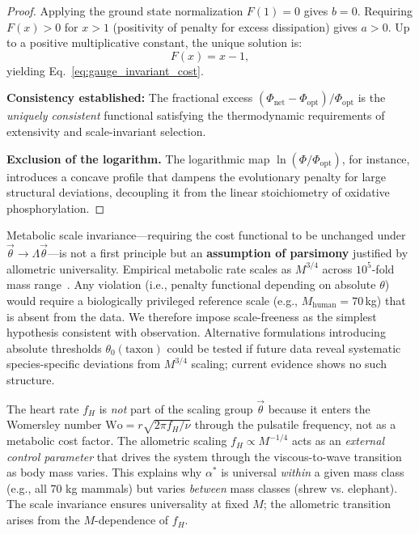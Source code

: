 \begin{proof}
Applying the ground state normalization $F(1) = 0$ gives $b = 0$. Requiring
$F(x) > 0$ for $x > 1$ (positivity of penalty for excess dissipation) gives $a >
0$. Up to a positive multiplicative constant, the unique solution is:
\begin{equation}
    F(x) = x - 1,
\end{equation}
yielding Eq.~\eqref{eq:gauge_invariant_cost}.

\textbf{Consistency established:} The fractional excess $(\Phi_{\mathrm{net}} -
\Phi_{\mathrm{opt}})/\Phi_{\mathrm{opt}}$ is the \emph{uniquely consistent}
functional satisfying the thermodynamic requirements of extensivity and
scale-invariant selection.

\textbf{Exclusion of the logarithm.} The logarithmic map
$\ln(\Phi/\Phi_{\mathrm{opt}})$, for instance, introduces a concave profile that
dampens the evolutionary penalty for large structural deviations, decoupling it
from the linear stoichiometry of oxidative phosphorylation.
\end{proof}

\begin{remark}
\label{rem:gauge_parsimony}
Metabolic scale invariance---requiring the cost functional to be unchanged
under $\vec{\theta} \to \Lambda \vec{\theta}$---is not a first principle but an
\textbf{assumption of parsimony} justified by allometric universality. Empirical
metabolic rate scales as $M^{3/4}$ across $10^5$-fold mass
range~\cite{savage2004}. Any violation (i.e., penalty functional depending on
absolute $\theta$) would require a biologically privileged reference scale
(e.g., $M_{\mathrm{human}} = 70\,$kg) that is absent from the data. We therefore
impose scale-freeness as the simplest hypothesis consistent with observation.
Alternative formulations introducing absolute thresholds
$\theta_0(\mathrm{taxon})$ could be tested if future data reveal systematic
species-specific deviations from $M^{3/4}$ scaling; current evidence shows
no such structure.
\end{remark}

\begin{remark}
The heart rate $f_H$ is \emph{not} part of the scaling group $\vec{\theta}$
because it enters the Womersley number $\mathrm{Wo} = r\sqrt{2\pi f_H/\nu}$
through the pulsatile frequency, not as a metabolic cost factor. The allometric
scaling $f_H \propto M^{-1/4}$ acts as an \emph{external control parameter} that
drives the system through the viscous-to-wave transition as body mass varies.
This explains why $\alpha^*$ is universal \emph{within} a given mass class
(e.g., all 70 kg mammals) but varies \emph{between} mass classes (shrew vs.
elephant). The scale invariance ensures universality at fixed $M$; the
allometric transition arises from the $M$-dependence of $f_H$.
\end{remark}

